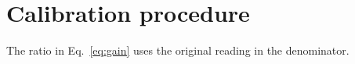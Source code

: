 \section{Calibration procedure}
The ratio in Eq.~\eqref{eq:gain} uses the original reading in the denominator.

